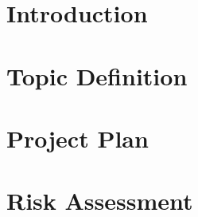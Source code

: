 \documentclass[a4paper]{article}
\begin{document}
\section{Introduction}

\section{Topic Definition}
\section{Project Plan}
\section{Risk Assessment}
\end{document}
